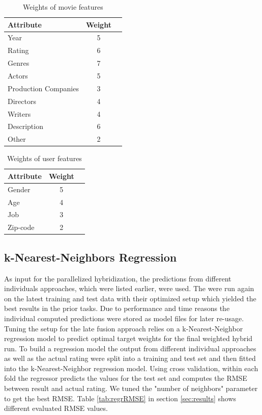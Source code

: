 \documentclass{sigish}
\begin{document}
\begin{table}[]
\centering
\begin{tabular}{|l|c|c|}
\hline
\textbf{Attribute} & \textbf{Weight} \\ \hline
Year             & 5               \\ \hline
Rating             & 6               \\ \hline
Genres             & 7               \\ \hline
Actors             & 5               \\ \hline
Production Companies             & 3               \\ \hline
Directors             & 4               \\ \hline
Writers             & 4               \\ \hline
Description             & 6               \\ \hline
Other             & 2               \\ \hline
\end{tabular}
\caption{Weights of movie features}
\label{tab:movie_weights}
\end{table}

\begin{table}[]
	\centering
	\begin{tabular}{|l|c|c|}
		\hline
		\textbf{Attribute} & \textbf{Weight} \\ \hline
		Gender             & 5               \\ \hline
		Age             & 4               \\ \hline
		Job             & 3               \\ \hline
		Zip-code             & 2               \\ \hline
	\end{tabular}
	\caption{Weights of user features}
	\label{tab:user_weights}
\end{table}

\subsection{k-Nearest-Neighbors Regression}
As input for the parallelized hybridization, the predictions from different individuals approaches, which were listed earlier, were used. The were run again on the latest training and test data with their optimized setup which yielded the best results in the prior tasks. Due to performance and time reasons the individual computed predictions were stored as model files for later re-usage. Tuning the setup for the late fusion approach relies on a k-Nearest-Neighbor regression model to predict optimal target weights for the final weighted hybrid run. To build a regression model the output from different individual approaches as well as the actual rating were split into a training and test set and then fitted into the k-Nearest-Neighbor regression model. Using cross validation, within each fold the regressor predicts the values for the test set and computes the RMSE between result and actual rating. We tuned the "number of neighbors" parameter to get the best RMSE. Table \ref{tab:regrRMSE} in section \ref{sec:results} shows different evaluated RMSE values. 
\end{document}
